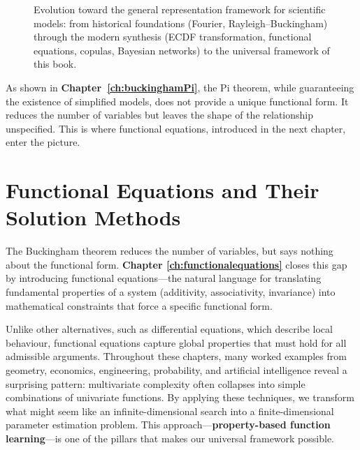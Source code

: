 \begin{figure}[!h]
\caption{Evolution toward the general representation framework for scientific models: from historical foundations (Fourier, Rayleigh–Buckingham) through the modern synthesis (ECDF transformation, functional equations, copulas, Bayesian networks) to the universal framework of this book.}
\label{fig:evolution-general-equation}
\end{figure}

As shown in \textbf{Chapter~\ref{ch:buckinghamPi}}, the Pi theorem, while guaranteeing the existence of simplified models, does not provide a unique functional form. It reduces the number of variables but leaves the shape of the relationship unspecified. This is where functional equations, introduced in the next chapter, enter the picture.

\section{Functional Equations and Their Solution Methods}
The Buckingham theorem reduces the number of variables, but says nothing about the functional form. \textbf{Chapter \ref{ch:functionalequations}} closes this gap by introducing functional equations—the natural language for translating fundamental properties of a system (additivity, associativity, invariance) into mathematical constraints that force a specific functional form.

Unlike other alternatives, such as differential equations, which describe local behaviour, functional equations capture global properties that must hold for all admissible arguments. Throughout these chapters, many worked examples from geometry, economics, engineering, probability, and artificial intelligence reveal a surprising pattern: multivariate complexity often collapses into simple combinations of univariate functions. By applying these techniques, we transform what might seem like an infinite-dimensional search into a finite-dimensional parameter estimation problem. This approach—\textbf{property-based function learning}—is one of the pillars that makes our universal framework possible.

